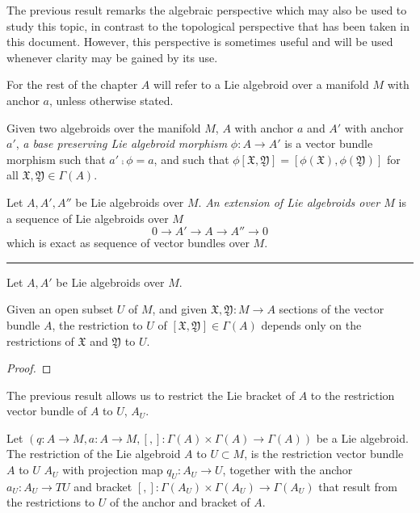 The previous result remarks the algebraic perspective which may also be used to study this topic, in contrast to the topological perspective that has been taken in this document. However, this perspective is sometimes useful and will be used whenever clarity may be gained by its use.

For the rest of the chapter $A$ will refer to a Lie algebroid over a manifold $M$ with anchor $a$, unless otherwise stated.

\begin{definition}  
Given two algebroids over the manifold $M$, $A$ with anchor $a$ and $A'$ with anchor $a'$, \emph{a base preserving Lie algebroid morphism} $\phi: A \to A'$ is a vector bundle morphism such that $a' \comp \phi = a $, and such that $\phi[\mathfrak X, \mathfrak Y] = [\phi(\mathfrak X), \phi(\mathfrak Y)]$ for all $\mathfrak X, \mathfrak Y \in \Gamma(A)$. 
\end{definition}

\begin{definition} 
Let $A, A', A''$ be Lie algebroids over $M$. \emph{An extension of Lie algebroids over $M$} is a sequence of Lie algebroids over $M$ \[ 0 \to A' \to A \to A'' \to 0 \] which is exact as sequence of vector bundles over $M$.
\end{definition}

\rule{10cm}{1mm}

\begin{definition}
Let $A, A'$ be Lie algebroids over $M$. 
\end{definition}

\begin{proposition}
Given an open subset $U$ of $M$, and given $\mathfrak X, \mathfrak Y : M \to A$ sections of the vector bundle $A$, the restriction to $U$ of $[\mathfrak X, \mathfrak Y] \in \Gamma(A)$ depends only on the restrictions of $\mathfrak X$ and $\mathfrak Y$ to $U$.
\end{proposition}
\begin{proof}

\end{proof}

The previous result allows us to restrict the Lie bracket of $A$ to the restriction vector bundle of $A$ to $U$, $A_U$.

\begin{definition}
Let $(q:A \to M, a: A \to M, [,]:\Gamma(A)\times \Gamma(A) \to \Gamma(A))$ be a Lie algebroid. The restriction of the Lie algebroid $A$ to $U \subset M$, is the restriction vector bundle $A$ to $U$ $A_U$ with projection map $q_U: A_U \to U$, together with the anchor $a_U:A_U \to TU$ and bracket $[,]:\Gamma(A_U)\times \Gamma(A_U) \to \Gamma(A_U)$ that result from the restrictions to $U$ of the anchor and bracket of $A$.
\end{definition}

